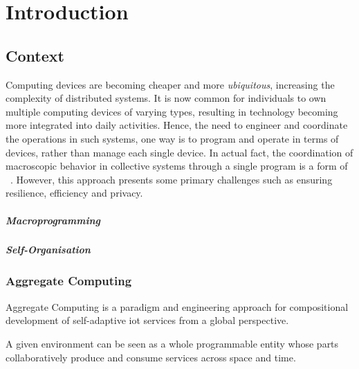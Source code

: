
\chapter{Introduction}
\label{chap:introduction}
\section{Context}
\label{sec:context}

Computing devices are becoming cheaper and more \emph{ubiquitous}, increasing the complexity of distributed systems.
It is now common for individuals to own multiple computing devices of varying types,
resulting in technology becoming more integrated into daily activities.
Hence, the need to engineer and coordinate the operations in such systems, one way is to program and operate in terms of
     devices, rather than manage each single device.
In actual fact, the coordination of macroscopic behavior in collective systems through a single program is a form of
~.
However, this approach presents some primary challenges such as ensuring resilience, efficiency and privacy.

\paragraph{Macroprogramming}

\paragraph{Self-Organisation}

\subsection{Aggregate Computing}
\label{subsec:aggregate-computing}
Aggregate Computing is a paradigm and engineering approach for compositional development of self-adaptive \ac{iot} services from a global perspective.

A given environment can be seen as a whole programmable entity whose parts collaboratively produce and consume services
across space and time.

